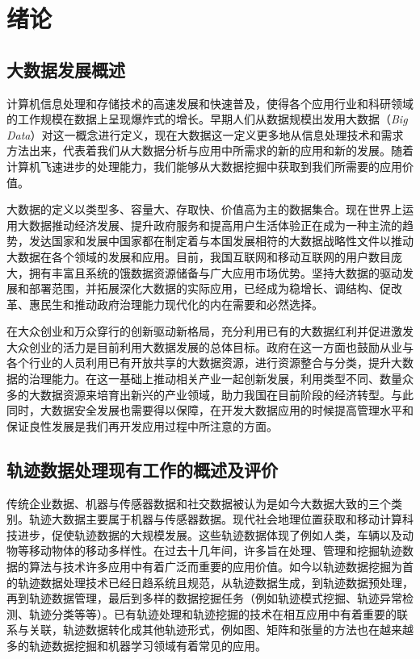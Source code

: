 

\chapter{绪论}
\label{chap:introduction}

\section{大数据发展概述}
\label{sec:big data general}

计算机信息处理和存储技术的高速发展和快速普及，使得各个应用行业和科研领域的工作规模在数据上呈现爆炸式的增长。早期人们从数据规模出发用大数据（\emph{Big Data}）对这一概念进行定义，现在大数据这一定义更多地从信息处理技术和需求方法出来，代表着我们从大数据分析与应用中所需求的新的应用和新的发展。随着计算机飞速进步的处理能力，我们能够从大数据挖掘中获取到我们所需要的应用价值。

大数据的定义以类型多、容量大、存取快、价值高为主的数据集合。现在世界上运用大数据推动经济发展、提升政府服务和提高用户生活体验正在成为一种主流的趋势，发达国家和发展中国家都在制定着与本国发展相符的大数据战略性文件以推动大数据在各个领域的发展和应用。目前，我国互联网和移动互联网的用户数目庞大，拥有丰富且系统的饿数据资源储备与广大应用市场优势。坚持大数据的驱动发展和部署范围，并拓展深化大数据的实际应用，已经成为稳增长、调结构、促改革、惠民生和推动政府治理能力现代化的内在需要和必然选择。

在大众创业和万众穿行的创新驱动新格局，充分利用已有的大数据红利并促进激发大众创业的活力是目前利用大数据发展的总体目标。政府在这一方面也鼓励从业与各个行业的人员利用已有开放共享的大数据资源，进行资源整合与分类，提升大数据的治理能力。在这一基础上推动相关产业一起创新发展，利用类型不同、数量众多的大数据资源来培育出新兴的产业领域，助力我国在目前阶段的经济转型。与此同时，大数据安全发展也需要得以保障，在开发大数据应用的时候提高管理水平和保证良性发展是我们再开发应用过程中所注意的方面。

\section{轨迹数据处理现有工作的概述及评价}
\label{sec:background}

传统企业数据、机器与传感器数据和社交数据被认为是如今大数据大致的三个类别。轨迹大数据主要属于机器与传感器数据。现代社会地理位置获取和移动计算科技进步，促使轨迹数据的大规模发展。这些轨迹数据体现了例如人类，车辆以及动物等移动物体的移动多样性。在过去十几年间，许多旨在处理、管理和挖掘轨迹数据的算法与技术许多应用中有着广泛而重要的应用价值。如今以轨迹数据挖掘为首的轨迹数据处理技术已经日趋系统且规范，从轨迹数据生成，到轨迹数据预处理，再到轨迹数据管理，最后到多样的数据挖掘任务（例如轨迹模式挖掘、轨迹异常检测、轨迹分类等等）。已有轨迹处理和轨迹挖掘的技术在相互应用中有着重要的联系与关联，轨迹数据转化成其他轨迹形式，例如图、矩阵和张量的方法也在越来越多的轨迹数据挖掘和机器学习领域有着常见的应用。


